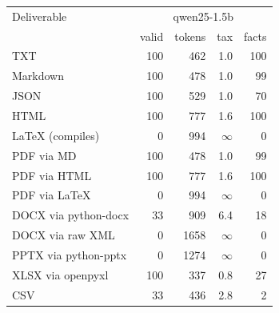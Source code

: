 \begin{tabular}{lrrrr}
\toprule
Deliverable & \multicolumn{4}{c}{qwen25-1.5b} \\
 & valid & tokens & tax & facts \\
\midrule
TXT & 100 & 462 & 1.0 & 100 \\
Markdown & 100 & 478 & 1.0 & 99 \\
JSON & 100 & 529 & 1.0 & 70 \\
HTML & 100 & 777 & 1.6 & 100 \\
LaTeX (compiles) & 0 & 994 & $\infty$ & 0 \\
PDF via MD & 100 & 478 & 1.0 & 99 \\
PDF via HTML & 100 & 777 & 1.6 & 100 \\
PDF via LaTeX & 0 & 994 & $\infty$ & 0 \\
DOCX via python-docx & 33 & 909 & 6.4 & 18 \\
DOCX via raw XML & 0 & 1658 & $\infty$ & 0 \\
PPTX via python-pptx & 0 & 1274 & $\infty$ & 0 \\
XLSX via openpyxl & 100 & 337 & 0.8 & 27 \\
CSV & 33 & 436 & 2.8 & 2 \\
\bottomrule
\end{tabular}
